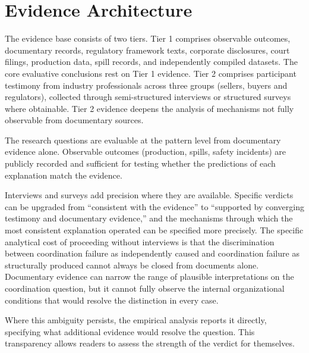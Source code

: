 \hypertarget{evidence-architecture}{%
\section{Evidence Architecture}\label{evidence-architecture}}

The evidence base consists of two tiers. Tier 1 comprises observable
outcomes, documentary records, regulatory framework texts, corporate
disclosures, court filings, production data, spill records, and
independently compiled datasets. The core evaluative conclusions rest on
Tier 1 evidence. Tier 2 comprises participant testimony from industry
professionals across three groups (sellers, buyers and regulators),
collected through semi-structured interviews or structured surveys where
obtainable. Tier 2 evidence deepens the analysis of mechanisms not fully
observable from documentary sources.

The research questions are evaluable at the pattern level from
documentary evidence alone. Observable outcomes (production, spills,
safety incidents) are publicly recorded and sufficient for testing
whether the predictions of each explanation match the evidence.

Interviews and surveys add precision where they are available. Specific
verdicts can be upgraded from ``consistent with the evidence'' to
``supported by converging testimony and documentary evidence,'' and the
mechanisms through which the most consistent explanation operated can be
specified more precisely. The specific analytical cost of proceeding
without interviews is that the discrimination between coordination
failure as independently caused and coordination failure as structurally
produced cannot always be closed from documents alone. Documentary
evidence can narrow the range of plausible interpretations on the
coordination question, but it cannot fully observe the internal
organizational conditions that would resolve the distinction in every
case.

Where this ambiguity persists, the empirical analysis reports it
directly, specifying what additional evidence would resolve the
question. This transparency allows readers to assess the strength of the
verdict for themselves.

